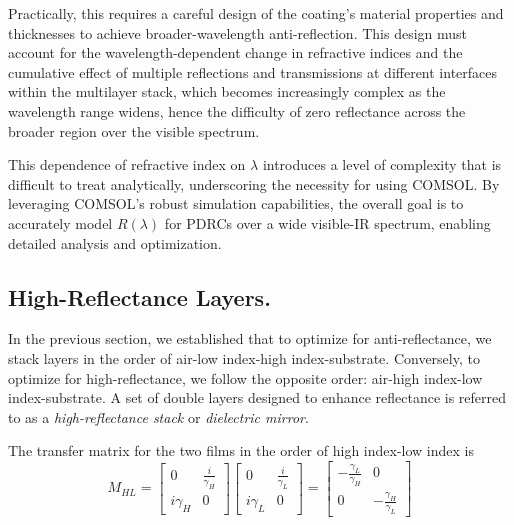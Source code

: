 Practically, this requires a careful design of the coating's material properties and thicknesses to achieve broader-wavelength anti-reflection. This design must account for the wavelength-dependent change in refractive indices and the cumulative effect of multiple reflections and transmissions at different interfaces within the multilayer stack, which becomes increasingly complex as the wavelength range widens, hence the difficulty of zero reflectance across the broader region over the visible spectrum.

This dependence of refractive index on $\lambda$ introduces a level of complexity that is difficult to treat analytically, underscoring the necessity for using COMSOL. By leveraging COMSOL's robust simulation capabilities, the overall goal is to accurately model $R(\lambda)$ for PDRCs over a wide visible-IR spectrum, enabling detailed analysis and optimization.

\subsection{High-Reflectance Layers.}
In the previous section, we established that to optimize for anti-reflectance, we stack layers in the order of air-low index-high index-substrate. Conversely, to optimize for high-reflectance, we follow the opposite order: air-high index-low index-substrate. A set of double layers designed to enhance reflectance is referred to as a \emph{high-reflectance stack} or \emph{dielectric mirror}.

The transfer matrix for the two films in the order of high index-low index is
    \[
      M_{HL} = 
            \begin{bmatrix}
            0 & \frac{i}{\gamma_H} \\
            i\gamma_H & 0
            \end{bmatrix}
            \begin{bmatrix}
            0 & \frac{i}{\gamma_L} \\
            i\gamma_L & 0
            \end{bmatrix} =
                    \begin{bmatrix}
                        -\frac{\gamma_L}{\gamma_H} & 0  \\
                        0 & -\frac{\gamma_H}{\gamma_L}
                    \end{bmatrix}
    \]
    
